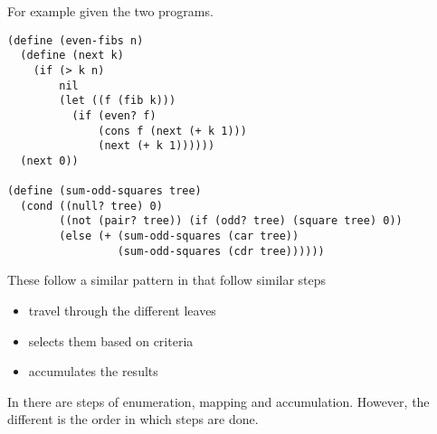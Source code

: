 \documentclass[11pt]{article}
\begin{document}
For example given the two programs.

\begin{verbatim}
(define (even-fibs n)
  (define (next k)
    (if (> k n)
        nil
        (let ((f (fib k)))
          (if (even? f)
              (cons f (next (+ k 1)))
              (next (+ k 1))))))
  (next 0))

(define (sum-odd-squares tree)
  (cond ((null? tree) 0)
        ((not (pair? tree)) (if (odd? tree) (square tree) 0))
        (else (+ (sum-odd-squares (car tree))
                 (sum-odd-squares (cdr tree))))))
\end{verbatim}

These follow a similar pattern in that follow similar steps

\begin{itemize}
\item travel through the different leaves
\item selects them based on criteria
\item accumulates the results
\end{itemize}

In there are steps of enumeration, mapping and accumulation. However,
the different is the order in which steps are done.
\end{document}
